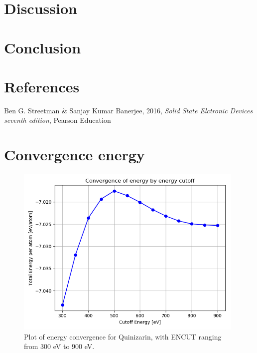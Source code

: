 \documentclass{article}
\begin{document}
\vspace{1cm}

\section{Discussion}    \label{sec:Discussion}

\vspace{1cm}

\section{Conclusion}    \label{sec:Conclusion}


\vspace{1cm}

\section{References} \label{sec:References}

    \begin{thebibliography}{}

    Ben G. Streetman \& Sanjay Kumar Banerjee, 2016, \textit{Solid State Elctronic Devices seventh edition}, Pearson Education


    \end{thebibliography}



\appendix

\section{Convergence energy}

  \begin{figure}[H]
      \centering
      \includegraphics[width = 11cm]{../fig/convergence_energy.png}
      \caption{Plot of energy convergence for Quinizarin, with ENCUT ranging from 300 eV to 900 eV. }
      \label{fig:convergence_energy.png}
  \end{figure}
\end{document}
